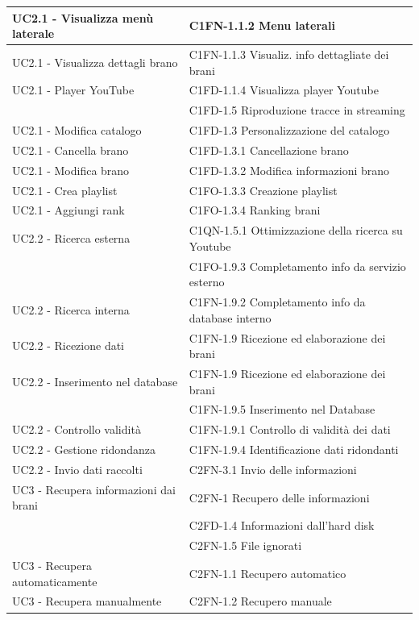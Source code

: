 \begin{footnotesize}
\begin{longtable}[!h]{|l|l|}
\hline
UC2.1 - Visualizza men\`u laterale & C1FN-1.1.2 Menu laterali \\ \hline
UC2.1 - Visualizza dettagli brano & C1FN-1.1.3 Visualiz. info dettagliate dei
brani \\ \hline
UC2.1 - Player YouTube & C1FD-1.1.4 Visualizza player Youtube \\
 & C1FD-1.5 Riproduzione tracce in streaming \\ \hline
UC2.1 - Modifica catalogo & C1FD-1.3 Personalizzazione del catalogo \\ \hline
UC2.1 - Cancella brano & C1FD-1.3.1 Cancellazione brano \\ \hline
UC2.1 - Modifica brano & C1FD-1.3.2 Modifica informazioni brano \\ \hline
UC2.1 - Crea playlist & C1FO-1.3.3 Creazione playlist \\ \hline
UC2.1 - Aggiungi rank & C1FO-1.3.4 Ranking brani \\ \hline
UC2.2 - Ricerca esterna & C1QN-1.5.1 Ottimizzazione della ricerca su Youtube \\
 & C1FO-1.9.3 Completamento info da servizio esterno \\ \hline
UC2.2 - Ricerca interna & C1FN-1.9.2 Completamento info da database interno \\
\hline
UC2.2 - Ricezione dati & C1FN-1.9 Ricezione ed elaborazione dei brani \\ \hline
UC2.2 - Inserimento nel database & C1FN-1.9 Ricezione ed elaborazione dei brani \\
 & C1FN-1.9.5 Inserimento nel Database \\ \hline
UC2.2 - Controllo validit\`a & C1FN-1.9.1 Controllo di validit\`a dei dati \\
\hline
UC2.2 - Gestione ridondanza & C1FN-1.9.4 Identificazione dati ridondanti \\
\hline
UC2.2 - Invio dati raccolti & C2FN-3.1 Invio delle informazioni \\ \hline
UC3 - Recupera informazioni dai brani & C2FN-1 Recupero delle informazioni \\
 & C2FD-1.4 Informazioni dall'hard disk \\ 
 & C2FN-1.5 File ignorati \\ \hline
UC3 - Recupera automaticamente & C2FN-1.1 Recupero automatico \\ \hline
UC3 - Recupera manualmente & C2FN-1.2 Recupero manuale \\ \hline

\end{longtable}
\end{footnotesize}
